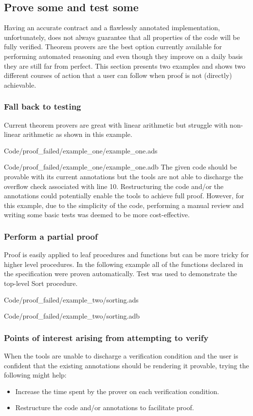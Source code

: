 \documentclass{llncs}
\begin{document}
\subsection{Prove some and test some}
Having an accurate contract and a flawlessly annotated implementation,
unfortunately, does not always guarantee that all properties of the
code will be fully verified. Theorem provers are the best option
currently available for performing automated reasoning and even though
they improve on a daily basis they are still far from perfect. This
section presents two examples and shows two different courses of
action that a user can follow when proof is not (directly) achievable.

\subsubsection{Fall back to testing}
Current theorem provers are great with linear arithmetic but struggle
with non-linear arithmetic as shown in this example.

{Code/proof_failed/example_one/example_one.ads}

{Code/proof_failed/example_one/example_one.adb}
The given code should be provable with its current annotations but the
tools are not able to discharge the overflow check associated with
line 10. Restructuring the code and/or the annotations could
potentially enable the tools to achieve full proof. However, for this
example, due to the simplicity of the code, performing a manual review
and writing some basic tests was deemed to be more cost-effective.

\subsubsection{Perform a partial proof}
Proof is easily applied to leaf procedures and functions but can be
more tricky for higher level procedures. In the following example all
of the functions declared in the specification were proven
automatically. Test was used to demonstrate the top-level Sort
procedure.


{Code/proof_failed/example_two/sorting.ads}


{Code/proof_failed/example_two/sorting.adb}

\subsubsection{Points of interest arising from attempting to verify}
When the tools are unable to discharge a verification condition and
the user is confident that the existing annotations should be
rendering it provable, trying the following might help:
\begin{itemize}
\item Increase the time spent by the prover on each verification
  condition.
\item Restructure the code and/or annotations to facilitate proof.
\end{itemize}
\end{document}
